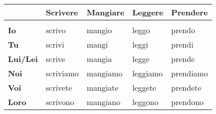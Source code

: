 \documentclass[letter,11pt]{article}
\begin{document}
\hspace{5pt}

\begin{tabular}{ |p{2cm}| p{2cm}| p{2cm}| p{2cm}| p{2cm}| }
      & Scrivere  & Mangiare & Leggere & Prendere  \\
    \hline
    \hline
     &  &  &  &  \\ \hline
    {\bf Io}   & scrivo    & mangio & leggo & prendo \\ \hline
    {\bf Tu}   & scrivi    & mangi & leggi & prendi \\ \hline
    {\bf Lui/Lei} & scrive & mangia & legge & prende \\ \hline
    {\bf Noi}  & scriviamo & mangiamo & leggiamo & prendiamo \\ \hline
    {\bf Voi}  & scrivete  & mangiate & leggete & prendete \\ \hline
    {\bf Loro} & scrivono  & mangiano & leggono & prendono \\ \hline
    \hline
    \end{tabular}
\end{document}

